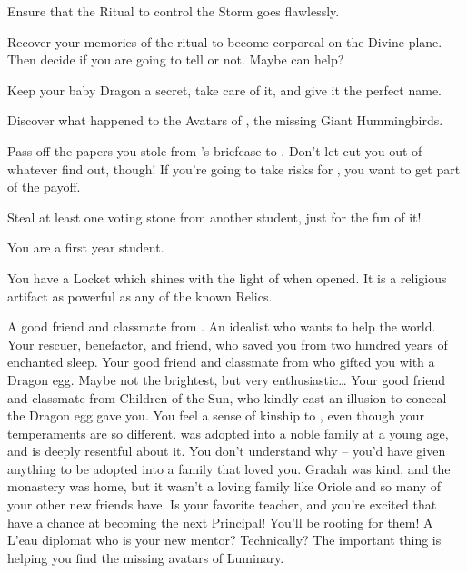 \documentclass[char]{GL2020}
\begin{document}
\begin{itemz}
	\item Ensure that the Ritual to control the Storm goes flawlessly.
	\item Recover your memories of the ritual to become corporeal on the Divine plane. Then decide if you are going to tell \cWildCard{} or not. Maybe \cTechStar{} can help?
	\item Keep your baby Dragon a secret, take care of it, and give it the perfect name.
	\item Discover what happened to the Avatars of \cFarmGod{}, the missing Giant Hummingbirds.
	\item Pass off the papers you stole from \cBunker{}'s briefcase to \cWildCard{}. Don't let \cWildCard{\them} cut you out of whatever \cWildCard{\they} find\cWildCard{\plural} out, though! If you're going to take risks for \cWildCard{\them}, you want to get part of the payoff.
	\item Steal at least one voting stone from another student, just for the fun of it!
\end{itemz}

\begin{itemz}[Notes]
	\item You are a first year student.
	\item You have a Locket which shines with the light of \cFarmGod{} when opened. It is a religious artifact as powerful as any of the known Relics.
\end{itemz}

\begin{contacts}
		\contact{\cTechStar{}} A good friend and classmate from \pTech{}. An idealist who wants to help the world.
	\contact{\cWildCard{}} Your rescuer, benefactor, and friend, who saved you from two hundred years of enchanted sleep.
	\contact{\cPirateChild{}} Your good friend and classmate from \pShip{} who gifted you with a Dragon egg. Maybe not the brightest, but very enthusiastic…
	\contact{\cAdopted{}} Your good friend and classmate from Children of the Sun, who kindly cast an illusion to conceal the Dragon egg \cPirateChild{} gave you. You feel a sense of kinship to \cAdopted{\them}, even though your temperaments are so different. \cAdopted{} was adopted into a noble family at a young age, and is deeply resentful about it. You don't understand why – you'd have given anything to be adopted into a family that loved you. Gradah was kind, and the monastery was home, but it wasn't a loving family like Oriole and so many of your other new friends have.
	\contact{\cMusic{}} Is your favorite teacher, and you're excited that \cMusic{\they} have a chance at becoming the next Principal! You'll be rooting for them! 
	\contact{\cJuniorStatesman{}} A L'eau diplomat who is your new mentor? Technically? The important thing is \cJuniorStatesman{\theyare} helping you find the missing avatars of Luminary.
\end{contacts}
\end{document}
